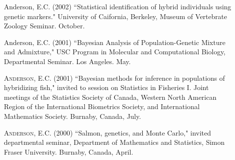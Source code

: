 \documentclass[11pt]{article}
\begin{document}
\begin{description}
\item[] {\sc Anderson, E.C.} (2002) ``Statistical identification of hybrid individuals using genetic markers." University of Caifornia, Berkeley, Museum of Vertebrate Zoology Seminar.  October.
\item[] {\sc Anderson, E.C.} (2001) ``Bayesian Analysis of Population-Genetic Mixture and Admixture," USC Program in Molecular and Computational Biology, Departmental Seminar. Los Angeles. May.
\item[] \textsc{Anderson, E.C.} (2001) ``Bayesian methods for inference in
populations of hybridizing fish," invited to session on Statistics in
Fisheries I. Joint meetings of the Statistics Society of Canada, Western
North American Region of the International Biometrics Society, and
International Mathematics Society. Burnaby, Canada, July.
\item[] \textsc{Anderson, E.C.} (2000) ``Salmon, genetics, and Monte Carlo," invited departmental
seminar, Department of Mathematics and Statistics, Simon Fraser University. Burnaby, Canada, April.
\end{description}
\end{document}

